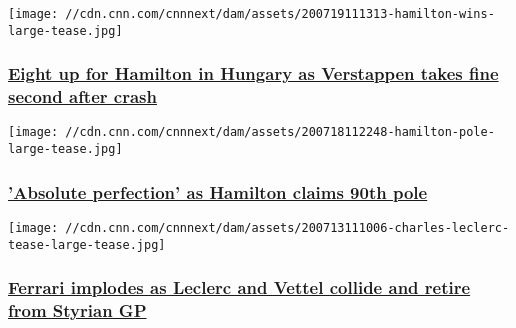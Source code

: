 \href{/2020/07/19/motorsport/hungarian-gp-hamilton-verstappen-spt-intl/index.html}{}

\texttt{[image: //cdn.cnn.com/cnnnext/dam/assets/200719111313-hamilton-wins-large-tease.jpg]}

\hypertarget{eight-up-for-hamilton-in-hungary-as-verstappen-takes-fine-second-after-crash}{%
\subsubsection{\texorpdfstring{\href{/2020/07/19/motorsport/hungarian-gp-hamilton-verstappen-spt-intl/index.html}{Eight
up for Hamilton in Hungary as Verstappen takes fine second after
crash}}{Eight up for Hamilton in Hungary as Verstappen takes fine second after crash}}\label{eight-up-for-hamilton-in-hungary-as-verstappen-takes-fine-second-after-crash}}

\href{/2020/07/18/motorsport/hungarian-gp-hamilton-pole-position-schumacher/index.html}{}

\texttt{[image: //cdn.cnn.com/cnnnext/dam/assets/200718112248-hamilton-pole-large-tease.jpg]}

\hypertarget{absolute-perfection-as-hamilton-claims-90th-pole}{%
\subsubsection{\texorpdfstring{\href{/2020/07/18/motorsport/hungarian-gp-hamilton-pole-position-schumacher/index.html}{'Absolute
perfection' as Hamilton claims 90th
pole}}{'Absolute perfection' as Hamilton claims 90th pole}}\label{absolute-perfection-as-hamilton-claims-90th-pole}}

\href{/2020/07/13/motorsport/ferrari-f1-styrian-gp-charles-leclerc-sebastian-vettel-spt-intl/index.html}{}

\texttt{[image: //cdn.cnn.com/cnnnext/dam/assets/200713111006-charles-leclerc-tease-large-tease.jpg]}

\hypertarget{ferrari-implodes-as-leclerc-and-vettel-collide-and-retire-from-styrian-gp}{%
\subsubsection{\texorpdfstring{\href{/2020/07/13/motorsport/ferrari-f1-styrian-gp-charles-leclerc-sebastian-vettel-spt-intl/index.html}{Ferrari
implodes as Leclerc and Vettel collide and retire from Styrian
GP}}{Ferrari implodes as Leclerc and Vettel collide and retire from Styrian GP}}\label{ferrari-implodes-as-leclerc-and-vettel-collide-and-retire-from-styrian-gp}}

